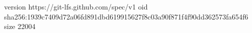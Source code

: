 version https://git-lfs.github.com/spec/v1
oid sha256:1939c7409d72a06fd891dbd619915627f8c03a90f871f4f90dd362573fa654f6
size 22004
